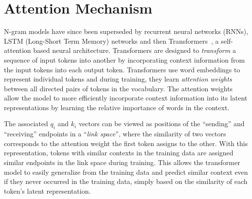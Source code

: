 \section{Attention Mechanism}
N-gram models have since been superseded by recurrent neural networks (RNNs), LSTM (Long-Short Term Memory) networks and then Transformers~\cite{VaswaniSPUJGKP17}, a self-attention based neural architecture. Transformers are designed to \textit{transform} a sequence of input tokens into another by incorporating context information from the input tokens into each output token. Transformers use word embeddings to represent individual tokens and during training, they learn \textit{attention weights} between all directed pairs of tokens in the vocabulary. The attention weights allow the model to more efficiently incorporate context information into its latent representations by learning the relative importance of words in the context.

The associated $q_i$ and $k_i$ vectors can be viewed as positions of the ``sending'' and ``receiving'' endpoints in a ``\textit{link space}'', where the similarity of two vectors corresponds to the attention weight the first token assigns to the other. With this representation, tokens with similar contexts in the training data are assigned similar endpoints in the link space during training. This allows the transformer model to easily generalize from the training data and predict similar context even if they never occurred in the training data, simply based on the similarity of each token's latent representation.

